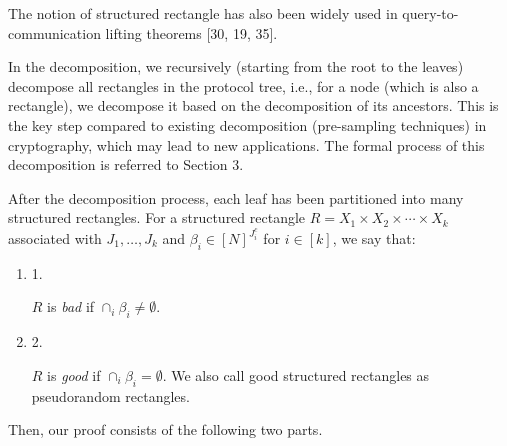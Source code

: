 \documentclass[10pt,a4paper]{article}
\begin{document}



The notion of structured rectangle has also been widely used in query-to-communication lifting theorems [30, 19, 35].\par




In the decomposition, we recursively (starting from the root to the leaves) decompose all rectangles in the protocol tree, i.e., for a node (which is also a rectangle), we decompose it based on the decomposition of its ancestors. This is the key step compared to existing decomposition (pre-sampling techniques) in cryptography, which may lead to new applications. The formal process of this decomposition is referred to Section 3.\par




After the decomposition process, each leaf has been partitioned into many structured rectangles. For a structured rectangle $R=X_{1}\times X_{2}\times\cdots\times X_{k}$ associated with $J_{1},\dots,J_{k}$ and $\beta_{i}\in[N]^{J_{i}^{c}}$ for $i\in[k]$, we say that:\par


\begin{enumerate}


\item[] 
1. 


$R$ is \emph{bad} if $\cap_{i}\beta_{i}\neq\emptyset$.\par





\item[] 
2. 


$R$ is \emph{good} if $\cap_{i}\beta_{i}=\emptyset$. We also call good structured rectangles as pseudorandom rectangles.\par





\end{enumerate}


Then, our proof consists of the following two parts.\par
\end{document}
